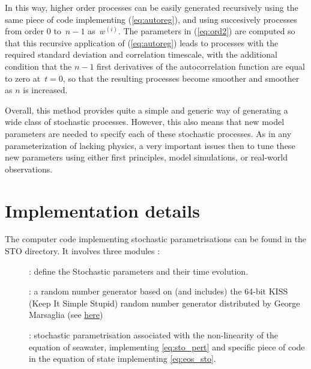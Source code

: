 \documentclass[../tex_main/NEMO_manual]{subfiles}
\begin{document}
\noindent
In this way, higher order processes can be easily generated recursively using 
the same piece of code implementing (\autoref{eq:autoreg}), 
and using succesively processes from order $0$ to~$n-1$ as~$w^{(i)}$.
The parameters in (\autoref{eq:ord2}) are computed so that this recursive application
of (\autoref{eq:autoreg}) leads to processes with the required standard deviation
and correlation timescale, with the additional condition that
the $n-1$ first derivatives of the autocorrelation function
are equal to zero at~$t=0$, so that the resulting processes
become smoother and smoother as $n$ is increased.

Overall, this method provides quite a simple and generic way of generating 
a wide class of stochastic processes. 
However, this also means that new model parameters are needed to specify each of 
these stochastic processes. As in any parameterization of lacking physics, 
a very important issues then to tune these new parameters using either first principles, 
model simulations, or real-world observations.

\section{Implementation details}
\label{sec:STO_thech_details}



The computer code implementing stochastic parametrisations can be found in the STO directory.
It involves three modules : 
\begin{description}
\item[] : define the Stochastic parameters and their time evolution.
\item[] : a random number generator based on (and includes) the 64-bit KISS 
                      (Keep It Simple Stupid) random number generator distributed by George Marsaglia 
                      (see \href{https://groups.google.com/forum/#!searchin/comp.lang.fortran/64-bit$20KISS$20RNGs}{here})
\item[] : stochastic parametrisation associated with the non-linearity of the equation of seawater, 
 implementing \autoref{eq:sto_pert} and specific piece of code in the equation of state implementing \autoref{eq:eos_sto}.
\end{description}
\end{document}
